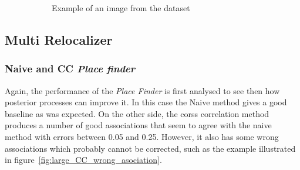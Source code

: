 \begin{figure}[htpb]
\begin{subfigure}[b]{5cm}
         \caption{Example of an image from the dataset}                
         \label{fig:large_desktop_example_image}
  \end{subfigure}
  \caption{}
\end{figure}

\subsection{Multi Relocalizer}
\label{sub:multi_relocalizer_large}

\subsubsection{Naive and CC \textit{Place finder}}
\label{ssub:naive_and_cc_place_finder_large}

Again, the performance of the \textit{Place Finder} is first analysed to see then how posterior processes can improve it. In this case the Naive method gives a good baseline as was expected. On the other side, the corss correlation method produces a number of good associations that seem to agree with the naive method with errors between 0.05 and 0.25. However, it also has some wrong associations which probably cannot be corrected, such as the example illustrated in figure~\ref{fig:large_CC_wrong_asociation}.\\

